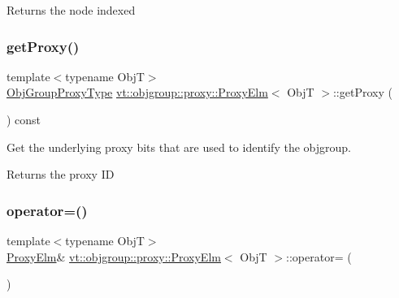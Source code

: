 \begin{DoxyReturn}{Returns}
the node indexed 
\end{DoxyReturn}
\mbox{\label{structvt_1_1objgroup_1_1proxy_1_1_proxy_elm_ae7cbfe997421f265fa51cd29adc6957e}} 
\subsubsection{\texorpdfstring{get\+Proxy()}{getProxy()}}
{\footnotesize\ttfamily template$<$typename ObjT$>$ \\
\hyperlink{namespacevt_ad7cae989df485fccca57f0792a880a8e}{Obj\+Group\+Proxy\+Type} \hyperlink{structvt_1_1objgroup_1_1proxy_1_1_proxy_elm}{vt\+::objgroup\+::proxy\+::\+Proxy\+Elm}$<$ ObjT $>$\+::get\+Proxy (\begin{DoxyParamCaption}{ }\end{DoxyParamCaption}) const\hspace{0.3cm}{\ttfamily [inline]}}



Get the underlying proxy bits that are used to identify the objgroup. 

\begin{DoxyReturn}{Returns}
the proxy ID 
\end{DoxyReturn}
\mbox{\label{structvt_1_1objgroup_1_1proxy_1_1_proxy_elm_a9211613f646a4f3d215cf1d9e76219db}} 
\subsubsection{\texorpdfstring{operator=()}{operator=()}}
{\footnotesize\ttfamily template$<$typename ObjT$>$ \\
\hyperlink{structvt_1_1objgroup_1_1proxy_1_1_proxy_elm}{Proxy\+Elm}\& \hyperlink{structvt_1_1objgroup_1_1proxy_1_1_proxy_elm}{vt\+::objgroup\+::proxy\+::\+Proxy\+Elm}$<$ ObjT $>$\+::operator= (\begin{DoxyParamCaption}\item[{\hyperlink{structvt_1_1objgroup_1_1proxy_1_1_proxy_elm}{Proxy\+Elm}$<$ ObjT $>$ const \&}]{ }\end{DoxyParamCaption})\hspace{0.3cm}{\ttfamily [default]}}

